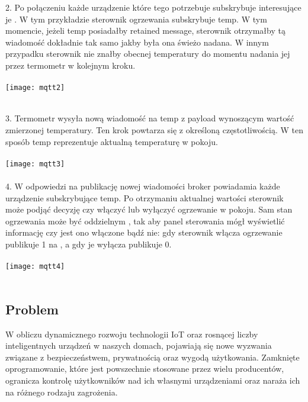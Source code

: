 2. Po połączeniu każde urządzenie które tego potrzebuje subskrybuje interesujące je . W tym przykładzie sterownik ogrzewania subskrybuje  temp. W tym momencie, jeżeli  temp posiadałby retained message, sterownik otrzymałby tą wiadomość dokładnie tak samo jakby była ona świeżo nadana. W innym przypadku sterownik nie znałby obecnej temperatury do momentu nadania jej przez termometr w kolejnym kroku.\\\\
\texttt{[image: mqtt2]}\\\\

\newpage

3. Termometr wysyła nową wiadomość na  temp z payload wynoszącym wartość zmierzonej temperatury. Ten krok powtarza się z określoną częstotliwością. W ten sposób  temp reprezentuje aktualną temperaturę w pokoju.\\\\
\texttt{[image: mqtt3]}\\\\

4. W odpowiedzi na publikację nowej wiadomości broker powiadamia każde urządzenie subskrybujące  temp. Po otrzymaniu aktualnej wartości sterownik może podjąć decyzję czy włączyć lub wyłączyć ogrzewanie w pokoju. Sam stan ogrzewania może być oddzielnym , tak aby panel sterowania mógł wyświetlić informację czy jest ono włączone bądź nie: gdy sterownik włącza ogrzewanie publikuje 1 na  , a gdy je wyłącza publikuje 0.\\\\
\texttt{[image: mqtt4]}\\\\

\newpage

\subsection{Problem}
W obliczu dynamicznego rozwoju technologii IoT oraz rosnącej liczby inteligentnych urządzeń w naszych domach, pojawiają się nowe wyzwania związane z bezpieczeństwem, prywatnością oraz wygodą użytkowania. Zamknięte oprogramowanie, które jest powszechnie stosowane przez wielu producentów, ogranicza kontrolę użytkowników nad ich własnymi urządzeniami oraz naraża ich na różnego rodzaju zagrożenia.\\

